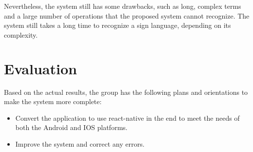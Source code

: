 
Nevertheless, the system still has some drawbacks, such as long, complex terms and a large number of operations that the proposed system cannot recognize. The system still takes a long time to recognize a sign language, depending on its complexity.

\section{Evaluation}

Based on the actual results, the group has the following plans and orientations to make the system more complete:

\begin{itemize}
  \item Convert the application to use react-native in the end to meet the needs of both the Android and IOS platforms.
  \item Improve the system and correct any errors.
\end{itemize}










